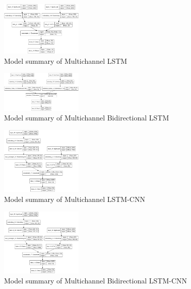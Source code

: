 \documentclass[conference]{IEEEtran}
\begin{document}
\begin{figure}[h]
\centering
\includegraphics[width=0.35\textwidth]{multichannellstm.png}
\caption{Model summary of Multichannel LSTM}
\label{fig:fig29}
\end{figure} 

\begin{figure}[h]
\centering
\includegraphics[width=0.35\textwidth]{multichannelbidlstm.png}
\caption{Model summary of Multichannel Bidirectional LSTM}
\label{fig:fig30}
\end{figure} 

\begin{figure}[h]
\centering
\includegraphics[width=0.35\textwidth]{lstm-cnn.png}
\caption{Model summary of Multichannel LSTM-CNN}
\label{fig:fig31}
\end{figure} 


\begin{figure}[h]
\centering
\includegraphics[width=0.35\textwidth]{bilstm-cnn.png}
\caption{Model summary of Multichannel Bidirectional LSTM-CNN}
\label{fig:fig32}
\end{figure} 
\end{document}
